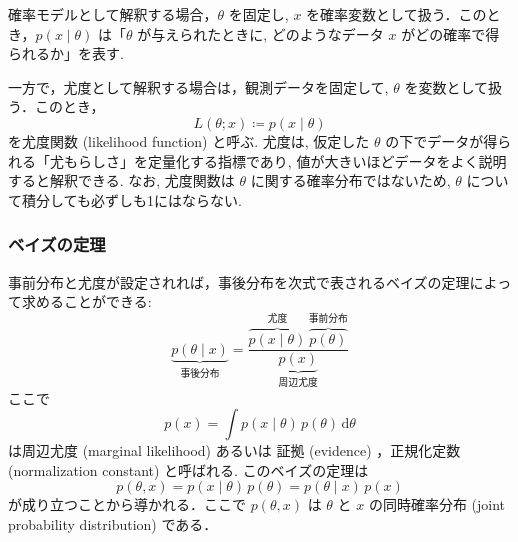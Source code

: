 \documentclass[titlepage]{ltjsbook}
\begin{document}
確率モデルとして解釈する場合，$\theta$ を固定し, $x$ を確率変数として扱う．このとき，$p(x \mid \theta)$ は「$\theta$ が与えられたときに, どのようなデータ $x$ がどの確率で得られるか」を表す. 

一方で，尤度として解釈する場合は，観測データを固定して, $\theta$ を変数として扱う．このとき，
\begin{equation}
L(\theta; x) \coloneq p(x \mid \theta)
\end{equation}
を尤度関数 (likelihood function) と呼ぶ. 尤度は, 仮定した $\theta$ の下でデータが得られる「尤もらしさ」を定量化する指標であり, 値が大きいほどデータをよく説明すると解釈できる. なお, 尤度関数は $\theta$ に関する確率分布ではないため, $\theta$ について積分しても必ずしも1にはならない. 

\subsubsection{ベイズの定理}
事前分布と尤度が設定されれば，事後分布を次式で表されるベイズの定理によって求めることができる: 
\begin{equation}
\underbrace{p(\theta \mid x)}_{\text{事後分布}} = \frac{\overbrace{p(x \mid \theta)}^{\text{尤度}}\, \overbrace{p(\theta)}^{\text{事前分布}}}{\underbrace{p(x)}_{\text{周辺尤度}}}
\end{equation}
ここで
\begin{equation}
p(x) = \int p(x \mid \theta)\, p(\theta)\, \mathrm{d}\theta
\end{equation}
は周辺尤度 (marginal likelihood) あるいは 証拠 (evidence) ，正規化定数 (normalization constant) と呼ばれる. このベイズの定理は
\begin{equation}
p(\theta, x) = p(x \mid \theta)\, p(\theta) = p(\theta \mid x)\, p(x)
\end{equation}
が成り立つことから導かれる．ここで $p(\theta, x)$ は $\theta$ と $x$ の同時確率分布 (joint probability distribution) である．
\end{document}
